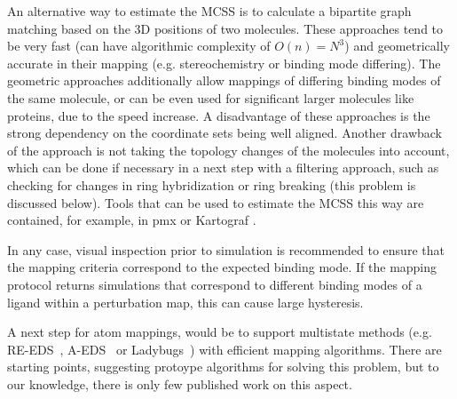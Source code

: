 \documentclass[9pt,bestpractices]{livecoms}
\begin{document}
An alternative way to estimate the MCSS is to calculate a bipartite graph matching based on the 3D positions of two molecules. These approaches tend to be very fast (can have algorithmic complexity of $O(n)=N^3$) and geometrically accurate in their mapping (e.g. stereochemistry or binding mode differing).
The geometric approaches additionally allow mappings of differing binding modes of the same molecule, or can be even used for significant larger molecules like proteins, due to the speed increase.
A disadvantage of these approaches is the strong dependency on the coordinate sets being well aligned. Another drawback of the approach is not taking the topology changes of the molecules into account, which can be done if necessary in a next step with a filtering approach, such as checking for changes in ring hybridization or ring breaking (this problem is discussed below).
Tools that can be used to estimate the MCSS this way are contained, for example, in pmx \cite{gapsys2015pmx} or Kartograf \cite{ries2024kartograf}.

In any case, visual inspection prior to simulation is recommended to ensure that the mapping criteria correspond to the expected binding mode. If the mapping protocol returns simulations that correspond to different binding modes of a ligand within a perturbation map, this can cause large hysteresis.

A next step for atom mappings, would be to support multistate methods (e.g. RE-EDS~\cite{sidler2016replica}, A-EDS~\cite{perthold2020toward} or Ladybugs~\cite{robo2023fast}) with efficient mapping algorithms. There are starting points, suggesting protoype algorithms for solving this problem, but to our knowledge, there is only few published work on this aspect. \cite{petrov2021perturbation}
\end{document}

